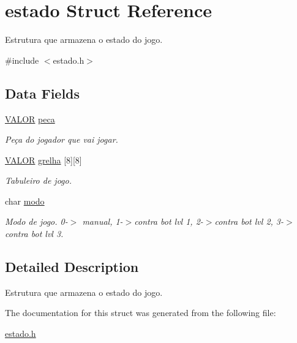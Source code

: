 \hypertarget{structestado}{}\section{estado Struct Reference}
\label{structestado}


Estrutura que armazena o estado do jogo.  




{\ttfamily \#include $<$estado.\+h$>$}

\subsection*{Data Fields}
\begin{DoxyCompactItemize}
\item 
\mbox{\label{structestado_ab36ee9db06349bf2088d6b16381fdef1}} 
\hyperlink{estado_8h_abfd806e47e2e69b38156c2eab6fda6c0}{V\+A\+L\+OR} \hyperlink{structestado_ab36ee9db06349bf2088d6b16381fdef1}{peca}
\begin{DoxyCompactList}\small\item\em Peça do jogador que vai jogar. \end{DoxyCompactList}\item 
\mbox{\label{structestado_a15b404b48236843b08e0016bba69fec8}} 
\hyperlink{estado_8h_abfd806e47e2e69b38156c2eab6fda6c0}{V\+A\+L\+OR} \hyperlink{structestado_a15b404b48236843b08e0016bba69fec8}{grelha} \mbox{[}8\mbox{]}\mbox{[}8\mbox{]}
\begin{DoxyCompactList}\small\item\em Tabuleiro de jogo. \end{DoxyCompactList}\item 
\mbox{\label{structestado_a8bdf62f83bb8988045d5016da2b43779}} 
char \hyperlink{structestado_a8bdf62f83bb8988045d5016da2b43779}{modo}
\begin{DoxyCompactList}\small\item\em Modo de jogo. 0-\/$>$ manual, 1-\/$>$contra bot lvl 1, 2-\/$>$contra bot lvl 2, 3-\/$>$contra bot lvl 3. \end{DoxyCompactList}\end{DoxyCompactItemize}


\subsection{Detailed Description}
Estrutura que armazena o estado do jogo. 

The documentation for this struct was generated from the following file\+:\begin{DoxyCompactItemize}
\item 
\hyperlink{estado_8h}{estado.\+h}\end{DoxyCompactItemize}

